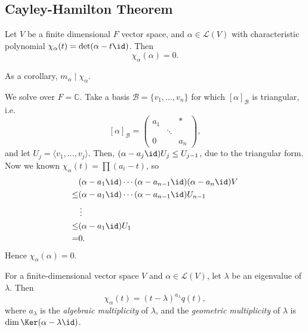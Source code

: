 \documentclass[12pt]{article}
\begin{document}
\subsection{Cayley-Hamilton Theorem}%
\label{sub:cayley_hamilton_theorem}

\begin{theorem}
	Let $V$ be a finite dimensional $F$ vector space, and $\alpha \in \mathcal{L}(V)$ with characteristic polynomial $\chi_{\alpha}(t) = \det(\alpha - t \id)$. Then
	\[
		\chi_{\alpha}(\alpha) = 0
	.\]
\end{theorem}

As a corollary, $m_{\alpha} \mid \chi_{\alpha}$.

\begin{proofbox}
	We solve over $F = \mathbb{C}$. Take a basis $\mathcal{B} = \{v_1, \ldots, v_n\}$ for which $[\alpha]_{\mathcal{B}}$ is triangular, i.e.
	\[
		[\alpha]_{\mathcal{B}} = 
		\begin{pmatrix}
			a_1 &  & \ast \\
			    & \ddots & \\
			0 & & a_n
		\end{pmatrix}
	,\]
	and let $U_j = \langle v_1, \ldots, v_j\rangle$. Then, $(\alpha - a_j \id)U_j \leq U_{j-1}$, due to the triangular form. Now we known $\chi_{\alpha}(t) = \prod (a_i - t)$, so
	\begin{align*}
		&(\alpha - a_1 \id) \cdots (\alpha - a_{n-1} \id) (\alpha - a_n \id) V \\
		\leq& (\alpha - a_1 \id) \cdots (\alpha - a_{n-1} \id) U_{n-1} \\
		    & \,\vdots \\
		\leq& (\alpha - a_1 \id) U_1 \\
		=& 0.
	\end{align*}
	Hence $\chi_{\alpha}(\alpha) = 0$.
\end{proofbox}

\begin{definition}[Multiplicity]
	For a finite-dimensional vector space $V$ and $\alpha \in \mathcal{L}(V)$, let $\lambda$ be an eigenvalue of $\lambda$. Then
	\[
		\chi_{\alpha}(t) = (t - \lambda)^{a_{\lambda}}q(t)
	,\]
	where $a_{\lambda}$ is the \textit{algebraic multiplicity} of $\lambda$, and the \textit{geometric multiplicity} of $\lambda$ is $\dim \Ker (\alpha - \lambda \id)$.
\end{definition}
\end{document}

